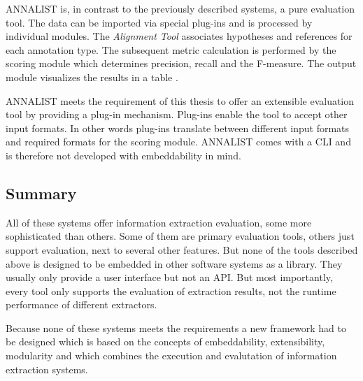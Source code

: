 ANNALIST is, in contrast to the previously described systems, a pure evaluation tool. The data can be imported via special plug-ins and is processed by individual modules. The \textit{Alignment Tool} associates hypotheses and references for each annotation type. The subsequent metric calculation is performed by the scoring module which determines precision, recall and the F-measure. The output module visualizes the results in a table \cite{Linsmayr:2010}.

ANNALIST meets the requirement of this thesis to offer an extensible evaluation tool by providing a plug-in mechanism. Plug-ins enable the tool to accept other input formats. In other words plug-ins translate between different input formats and required formats for the scoring module. ANNALIST comes with a \gls{CLI} and is therefore not developed with embeddability in mind.

\subsection{Summary}
All of these systems offer information extraction evaluation, some more sophisticated than others. Some of them are primary evaluation tools, others just support evaluation, next to several other features. But none of the tools described above is designed to be embedded in other software systems as a library. They usually only provide a user interface but not an \gls{API}. But most importantly, every tool only supports the evaluation of extraction results, not the runtime performance of different extractors.

Because none of these systems meets the requirements a new framework had to be designed which is based on the concepts of embeddability, extensibility, modularity and which combines the execution and evalutation of information extraction systems.

